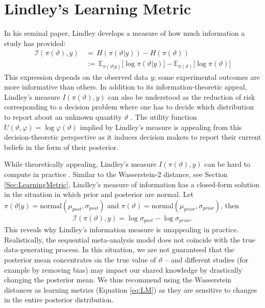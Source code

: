 \section{Lindley's Learning Metric}
\label{Sec:Lindley}
In his seminal paper, Lindley \citep{Lindley_1956} develops a measure of how much information a study has provided: 
\begin{align}
    \mathcal{I}(\pi(\vartheta),y) \, &= \, H(\pi(\vartheta\lvert y)) - H(\pi(\vartheta)) \\ \nonumber
    \, &:= \,\mathbb{E}_{\pi(\vartheta\lvert y)}\bigg [ \log\pi(\vartheta\lvert y) \bigg] - \mathbb{E}_{\pi(\vartheta)}\bigg [ \log\pi(\vartheta) \bigg]
\end{align}
This expression depends on the observed data $y$; some experimental outcomes are more informative than others. In addition to its information-theoretic appeal, Lindley's measure $I(\pi(\vartheta),y)$ can also be understood as the reduction of risk corresponding to a decision problem where one has to decide which distribution to report about an unknown quantity $\vartheta$ \citep{Parmigiani_1994}. The utility function $U(\vartheta, \varphi) = \log \varphi(\vartheta)$ implied by Lindley's measure is appealing from this decision-theoretic perspective as it induces decision makers to report their current beliefs in the form of their posterior. 


While theoretically appealing, Lindley's measure $I(\pi(\vartheta),y)$ can be hard to compute in practice \citep{Batu_Dasgupta_Kumar_Rubinfeld_2002}. 
Similar to the Wasserstein-2 distance, see Section \ref{Sec:LearningMetric}, Lindley's measure of information has a closed-form solution in the situation in which prior and posterior are normal. Let $\pi(\vartheta\lvert y) = \text{normal}(\mu_{post},\sigma_{post})$ and $\pi(\vartheta) = \text{normal}(\mu_{prior},\sigma_{prior})$, then 
\begin{align}
    \mathcal{I}(\pi(\vartheta),y) = \log{\sigma_{post}}-\log{\sigma_{prior}}.
\end{align}
This reveals why Lindley's information measure is unappealing in practice. Realistically, the sequential meta-analysis model does not coincide with the true data-generating process. In this situation, we are not guaranteed that the posterior mean concentrates on the true value of $\vartheta$ -- and different studies (for example by removing bias) may impact our shared knowledge by drastically changing the posterior mean. We thus recommend using the Wasserstein distances as learning metrics (Equation \ref{eq:LM}) as they are sensitive to changes in the entire posterior distribution.
